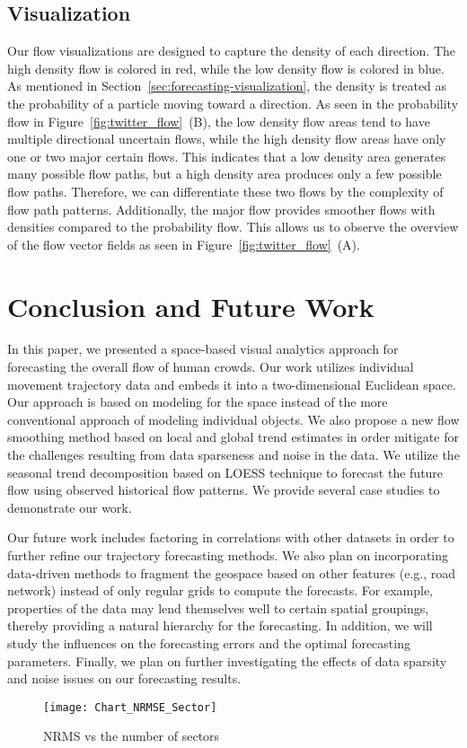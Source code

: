 

\subsection{Visualization}
Our flow visualizations are designed to capture the density of each direction. The high density flow is colored in red, while the low density flow is colored in blue. As mentioned in Section~\ref{sec:forecasting-visualization}, the density is treated as the probability of a particle moving toward a direction. As seen in the probability flow in Figure~\ref{fig:twitter_flow}~(B), the low density flow areas tend to have multiple directional uncertain flows, while the high density flow areas have only one or two major certain flows. This indicates that a low density area generates many possible flow paths, but a high density area produces only a few possible flow paths. Therefore, we can differentiate these two flows by the complexity of flow path patterns. Additionally, the major flow provides smoother flows with densities compared to the probability flow. This allows us to observe the overview of the flow vector fields as seen in Figure~\ref{fig:twitter_flow}~(A).

\section{Conclusion and Future Work}

In this paper, we presented a space-based visual analytics approach for forecasting the overall flow of human crowds. 
Our work utilizes individual movement trajectory data and embeds it into a two-dimensional Euclidean space.
Our approach is based on modeling for the space instead of the more conventional approach of modeling individual objects. 
We also propose a new flow smoothing method based on local and global trend estimates in order mitigate for the challenges resulting from data sparseness and noise in the data. 
We utilize the seasonal trend decomposition based on LOESS technique to forecast the future flow using observed historical flow patterns.
We provide several case studies to demonstrate our work. 

Our future work includes factoring in correlations with other datasets in order to further refine our trajectory forecasting methods.
We also plan on incorporating data-driven methods to fragment the geospace based on other features (e.g., road network) instead of only regular grids to compute the forecasts. 
For example, properties of the data may lend themselves well to certain spatial groupings, thereby providing a natural hierarchy for the forecasting. In addition, we will study the influences on the forecasting errors and the optimal forecasting parameters. 
Finally, we plan on further investigating the effects of data sparsity and noise issues on our forecasting results. 


\begin{figure}[t]
	\centering
	\texttt{[image: Chart\_NRMSE\_Sector]}
	\caption{NRMS vs the number of sectors}
	\label{fig:Chart_NRMSE_Sector}
\end{figure}



